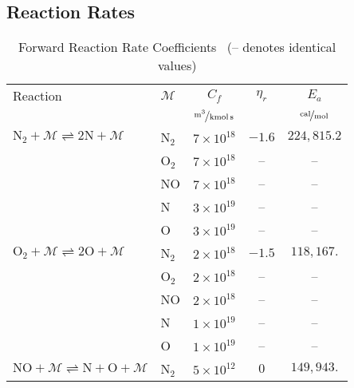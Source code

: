 \subsection{Reaction Rates}
\begin{table}[hbtp]
  \begin{center}
    \caption{Forward Reaction Rate Coefficients~\cite{park_future_nasa_missions_I} (-- denotes identical values)}
    \vspace{1em}
    \begin{tabular}{|l|l|ccc|} \hline
      Reaction  &  $\mathcal{M}$ & $C_f$ & $\eta_r$  & $E_a$  \\ 
                & & $\unitfrac{m^3}{kmol\,s}$ &   & $\unitfrac{cal}{mol}$  \\ \hline \hline
  $\text{N}_2 + \mathcal{M} \rightleftharpoons 2\text{N} + \mathcal{M}$ & N$_2$ & $7\times 10^{18}$ & $-1.6$  & $224,815.2$ \\
                                                                        & O$_2$ & $7\times 10^{18}$ & --      & --          \\
                                                                        & NO    & $7\times 10^{18}$ & --      & --          \\
                                                                        & N     & $3\times 10^{19}$ & --      & --          \\ 
                                                                        & O     & $3\times 10^{19}$ & --      & --          \\ \hline
  $\text{O}_2 + \mathcal{M} \rightleftharpoons 2\text{O} + \mathcal{M}$ & N$_2$ & $2\times 10^{18}$ & $-1.5$  & $118,167.$  \\
                                                                        & O$_2$ & $2\times 10^{18}$ & --      & --          \\
                                                                        & NO    & $2\times 10^{18}$ & --      & --          \\
                                                                        & N     & $1\times 10^{19}$ & --      & --          \\
                                                                        & O     & $1\times 10^{19}$ & --      & --          \\ \hline
  $\text{NO} + \mathcal{M}  \rightleftharpoons \text{N} + \text{O} + \mathcal{M}$ & N$_2$ & $5\times 10^{12}$ & $0$  & $149,943.$ \\

\end{tabular}
\end{center}
\end{table}
